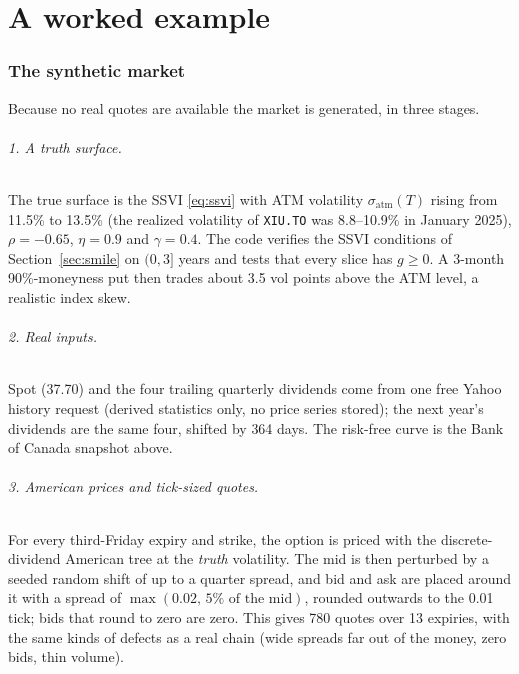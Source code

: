 \documentclass[11pt]{article}
\begin{document}
\part{A worked example}

\section{The synthetic market}\label{sec:synthetic}

Because no real quotes are available the market is generated, in three stages.

\paragraph{1. A truth surface.} The true surface is the SSVI
\eqref{eq:ssvi} with ATM volatility $\sigma_{\mathrm{atm}}(T)$ rising from
11.5\% to 13.5\% (the realized volatility of \texttt{XIU.TO} was 8.8--10.9\% in
January 2025), $\rho=-0.65$, $\eta=0.9$ and $\gamma=0.4$. The code verifies the
SSVI conditions of Section~\ref{sec:smile} on $(0,3]$ years and tests that every
slice has $g\ge0$. A 3-month 90\%-moneyness put then trades about 3.5 vol points
above the ATM level, a realistic index skew.

\paragraph{2. Real inputs.} Spot (37.70) and the four trailing quarterly
dividends come from one free Yahoo history request (derived statistics only, no
price series stored); the next year's dividends are the same four, shifted by
364 days. The risk-free curve is the Bank of Canada snapshot above.

\paragraph{3. American prices and tick-sized quotes.} For every third-Friday
expiry and strike, the option is priced with the discrete-dividend American tree
at the \emph{truth} volatility. The mid is then perturbed by a seeded random
shift of up to a quarter spread, and bid and ask are placed around it with a
spread of $\max(0.02,\,5\%\text{ of the mid})$, rounded outwards to the 0.01
tick; bids that round to zero are zero. This gives 780 quotes over 13 expiries,
with the same kinds of defects as a real chain (wide spreads far out of the money,
zero bids, thin volume).
\end{document}
